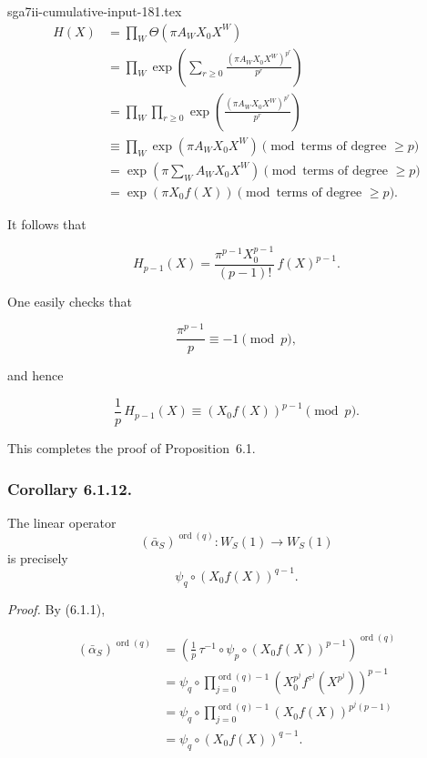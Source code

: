 \begin{filecontents*}{sga7ii-cumulative-input-181.tex}
\begin{equation}\tag{6.1.8}
\begin{aligned}
H(X)
&=\prod_W\Theta(\pi A_WX_0X^W)\\
&=\prod_W\exp\!\left(
\sum_{r\geq0}\frac{(\pi A_WX_0X^W)^{p^r}}{p^r}
\right)\\
&=\prod_W\prod_{r\geq0}
\exp\!\left(\frac{(\pi A_WX_0X^W)^{p^r}}{p^r}\right)\\
&\equiv\prod_W\exp(\pi A_WX_0X^W)
\pmod{\text{terms of degree }\geq p}\\
&=\exp\!\left(\pi\sum_WA_WX_0X^W\right)
\pmod{\text{terms of degree }\geq p}\\
&=\exp(\pi X_0f(X))
\pmod{\text{terms of degree }\geq p}.
\end{aligned}
\end{equation}

It follows that

\begin{equation}\tag{6.1.9}
H_{p-1}(X)
=\frac{\pi^{p-1}X_0^{p-1}}{(p-1)!}\,f(X)^{p-1}.
\end{equation}

One easily checks that

\begin{equation}\tag{6.1.10}
\frac{\pi^{p-1}}p\equiv-1\pmod p,
\end{equation}

and hence

\begin{equation}\tag{6.1.11}
\frac1p\,H_{p-1}(X)
\equiv(X_0f(X))^{p-1}\pmod p.
\end{equation}

This completes the proof of Proposition~6.1.

\subsubsection*{Corollary 6.1.12.}
The linear operator
\[
(\bar\alpha_S)^{\operatorname{ord}(q)}:W_S(1)\longrightarrow W_S(1)
\]
is precisely
\[
\psi_q\circ(X_0f(X))^{q-1}.
\]

\noindent\emph{Proof.}
By (6.1.1),

\begin{equation*}
\begin{aligned}
(\bar\alpha_S)^{\operatorname{ord}(q)}
&=
\left(
\frac1p\,\tau^{-1}\circ\psi_p\circ(X_0f(X))^{p-1}
\right)^{\operatorname{ord}(q)}\\
&=
\psi_q\circ
\prod_{j=0}^{\operatorname{ord}(q)-1}
\left(X_0^{p^j}f^{\tau^j}(X^{p^j})\right)^{p-1}\\
&=
\psi_q\circ
\prod_{j=0}^{\operatorname{ord}(q)-1}
(X_0f(X))^{p^j(p-1)}\\
&=\psi_q\circ(X_0f(X))^{q-1}.
\end{aligned}
\end{equation*}


\end{filecontents*}
